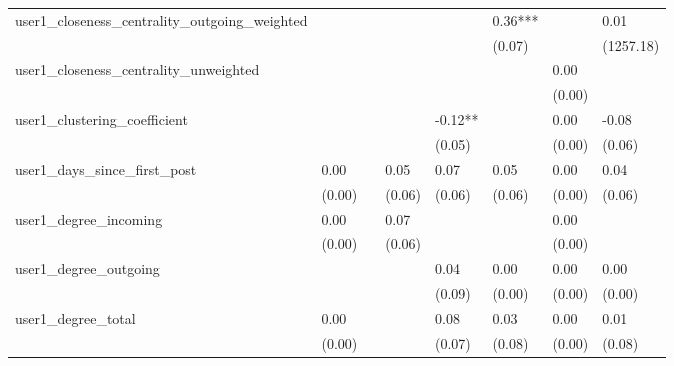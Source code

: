 \begin{table}
\begin{center}
\begin{tabular}{llllllll}
user1_closeness_centrality_outgoing_weighted              &          &         &         &         & 0.36***  &                    & 0.01       \\
                                                          &          &         &         &         & (0.07)   &                    & (1257.18)  \\
user1_closeness_centrality_unweighted                     &          &         &         &         &          & 0.00               &            \\
                                                          &          &         &         &         &          & (0.00)             &            \\
user1_clustering_coefficient                              &          &         &         & -0.12** &          & 0.00               & -0.08      \\
                                                          &          &         &         & (0.05)  &          & (0.00)             & (0.06)     \\
user1_days_since_first_post                               & 0.00     &         & 0.05    & 0.07    & 0.05     & 0.00               & 0.04       \\
                                                          & (0.00)   &         & (0.06)  & (0.06)  & (0.06)   & (0.00)             & (0.06)     \\
user1_degree_incoming                                     & 0.00     &         & 0.07    &         &          & 0.00               &            \\
                                                          & (0.00)   &         & (0.06)  &         &          & (0.00)             &            \\
user1_degree_outgoing                                     &          &         &         & 0.04    & 0.00     & 0.00               & 0.00       \\
                                                          &          &         &         & (0.09)  & (0.00)   & (0.00)             & (0.00)     \\
user1_degree_total                                        & 0.00     &         &         & 0.08    & 0.03     & 0.00               & 0.01       \\
                                                          & (0.00)   &         &         & (0.07)  & (0.08)   & (0.00)             & (0.08)     \\

\end{tabular}
\end{center}
\end{table}
